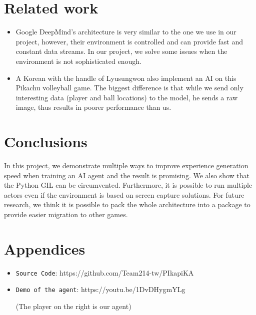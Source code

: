 \documentclass[sigconf]{acmart}
\begin{document}
\section{Related work}
\begin{itemize}
  \item{} Google DeepMind's architecture\cite{horgan2018distributed} is very similar to the one we use in our project, however, their environment is controlled and can provide fast and constant data streams. In our project, we solve some issues when the environment is not sophisticated enough.
 
  \item{} A Korean with the handle of Lyusungwon also implement an AI on this Pikachu volleyball game. \cite{PikaKR} The biggest difference is that while we send only interesting data (player and ball locations) to the model, he sends a raw image, thus results in poorer performance than us. 
\end{itemize}
\section{Conclusions}
In this project, we demonstrate multiple ways to improve experience generation speed when training an AI agent and the result is promising. We also show that the Python GIL can be circumvented. Furthermore, it is possible to run multiple actors even if the environment is based on screen capture solutions. For future research, we think it is possible to pack the whole architecture into a package to provide easier migration to other games.

\section{Appendices}
\begin{itemize}
  \item{\verb|Source Code|}: https://github.com/Team214-tw/PIkapiKA
  \item{\verb|Demo of the agent|}: 
  https://youtu.be/1DvDHygmYLg 
  \begin{sloppypar}
    (The player on the right is our agent)
  \end{sloppypar}

\end{itemize}



\end{document}

